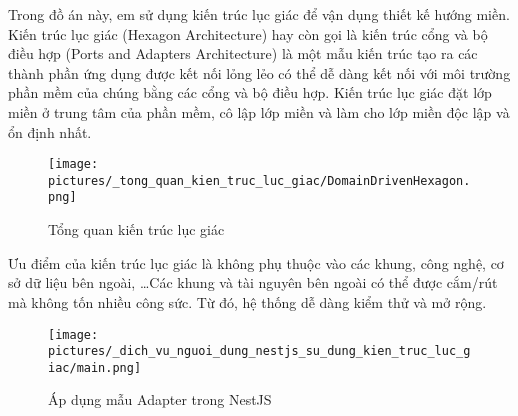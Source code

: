 Trong đồ án này, em sử dụng kiến trúc lục giác để vận dụng thiết kế hướng miền. Kiến trúc lục giác (Hexagon Architecture) hay còn gọi là kiến trúc cổng và bộ điều hợp (Ports and Adapters Architecture) là một mẫu kiến trúc tạo ra các thành phần ứng dụng được kết nối lỏng lẻo có thể dễ dàng kết nối với môi trường phần mềm của chúng bằng các cổng và bộ điều hợp. Kiến trúc lục giác đặt lớp miền ở trung tâm của phần mềm, cô lập lớp miền và làm cho lớp miền độc lập và ổn định nhất.

\begin{figure}[H]

    \centering

    \texttt{[image: pictures/\_tong\_quan\_kien\_truc\_luc\_giac/DomainDrivenHexagon.png]}

    \caption{Tổng quan kiến trúc lục giác}

\end{figure}

Ưu điểm của kiến trúc lục giác là không phụ thuộc vào các khung, công nghệ, cơ sở dữ liệu bên ngoài, \dots Các khung và tài nguyên bên ngoài có thể được cắm/rút mà không tốn nhiều công sức. Từ đó, hệ thống dễ dàng kiểm thử và mở rộng.



\begin{figure}[H]

    \centering

    \texttt{[image: pictures/\_dich\_vu\_nguoi\_dung\_nestjs\_su\_dung\_kien\_truc\_luc\_giac/main.png]}

    \caption{Áp dụng mẫu Adapter trong  NestJS}

\end{figure}














